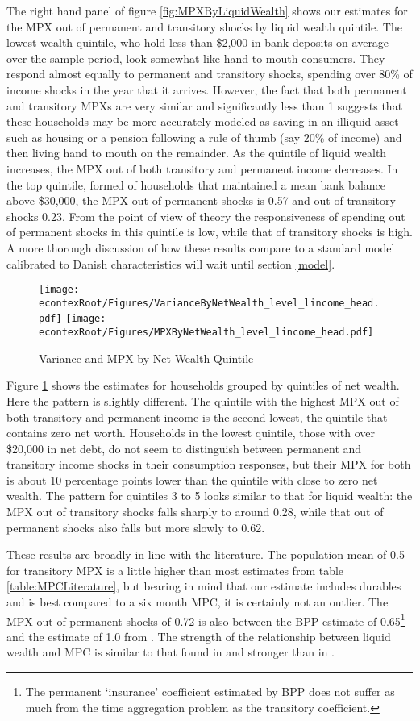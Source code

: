 \documentclass[titlepage]{\econtex}\newcommand{\texname}{ConsumptionHeterogeneity}
\begin{document}
The right hand panel of figure \ref{fig:MPXByLiquidWealth} shows our estimates for the MPX out of permanent and transitory shocks by liquid wealth quintile. The lowest wealth quintile, who hold less than \$2,000 in bank deposits on average over the sample period, look somewhat like hand-to-mouth consumers. They respond almost equally to permanent and transitory shocks, spending over 80\% of income shocks in the year that it arrives. However, the fact that both permanent and transitory MPXs are very similar and significantly less than 1 suggests that these households may be more accurately modeled as saving in an illiquid asset such as housing or a pension following a rule of thumb (say 20\% of income) and then living hand to mouth on the remainder. As the quintile of liquid wealth increases, the MPX out of both transitory and permanent income decreases. In the top quintile, formed of households that maintained a mean bank balance above \$30,000, the MPX out of permanent shocks is 0.57 and out of transitory shocks 0.23. From the point of view of theory the responsiveness of spending out of permanent shocks in this quintile is low, while that of transitory shocks is high. A more thorough discussion of how these results compare to a standard model calibrated to Danish characteristics will wait until section \ref{model}.
\begin{figure}
	\centering
	\texttt{[image: \\econtexRoot/Figures/VarianceByNetWealth\_level\_lincome\_head.pdf]}
	\centering
	\texttt{[image: \\econtexRoot/Figures/MPXByNetWealth\_level\_lincome\_head.pdf]}
	\caption{Variance and MPX by Net Wealth Quintile}
	\label{fig:MPXByNetWealth}
\end{figure}

Figure \ref{fig:MPXByNetWealth} shows the estimates for households grouped by quintiles of net wealth. Here the pattern is slightly different. The quintile with the highest MPX out of both transitory and permanent income is the second lowest, the quintile that contains zero net worth. Households in the lowest quintile, those with over \$20,000 in net debt, do not seem to distinguish between permanent and transitory income shocks in their consumption responses, but their MPX for both is about 10 percentage points lower than the quintile with close to zero net wealth. The pattern for quintiles 3 to 5 looks similar to that for liquid wealth: the MPX out of transitory shocks falls sharply to around 0.28, while that out of permanent shocks also falls but more slowly to 0.62.

These results are broadly in line with the literature. The population mean of 0.5 for transitory MPX is a little higher than most estimates from table \ref{table:MPCLiterature}, but bearing in mind that our estimate includes durables and is best compared to a six month MPC, it is certainly not an outlier. The MPX out of permanent shocks of 0.72 is also between the BPP estimate of 0.65\footnote{The permanent `insurance' coefficient estimated by BPP does not suffer as much from the time aggregation problem as the transitory coefficient.} and the estimate of 1.0 from \cite{gelman_response_2016}. The strength of the relationship between liquid wealth and MPC is similar to that found in \cite{gelman_what_2016} and stronger than in \cite{fagereng_mpc_2016}.
\end{document}
